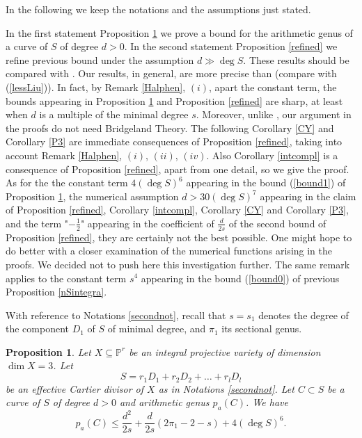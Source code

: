\documentclass[9pt,a4paper]{amsart}
\theoremstyle{plain}
\newtheorem{proposition}[theorem]{Proposition}
\theoremstyle{definition}
\theoremstyle{remark}
\begin{document}
In the following we keep the notations and the assumptions just
stated.

\smallskip
In the first statement Proposition \ref{nSnonintegra} we prove a
bound for the arithmetic genus of  a curve of $S$ of degree $d>0$.
In the second statement Proposition \ref{refined} we refine previous
bound under the assumption $d\gg \deg S$. These results should be
compared with \cite[Proposition 4.3 and Corollary 4.4]{Liu}. Our
results, in general, are more precise than
\cite[loc. cit.]{Liu} (compare with (\ref{lessLiu})).  In fact, by Remark \ref{Halphen}, $(i)$,
apart the constant term, the bounds appearing in  Proposition
\ref{nSnonintegra} and Proposition \ref{refined} are sharp, at least
when $d$ is a multiple of the minimal degree $s$. Moreover, unlike
\cite{Liu}, our argument in the proofs do not need Bridgeland
Theory. The following  Corollary \ref{CY} and Corollary \ref{P3} are
immediate consequences of Proposition \ref{refined}, taking into
account Remark \ref{Halphen}, $(i)$, $(ii)$, $(iv)$. Also Corollary \ref{intcompl} is a
consequence  of Proposition \ref{refined}, apart from one detail, so
we give the proof. As for the the constant term $4(\deg S)^6$
appearing in the bound (\ref{bound1}) of Proposition
\ref{nSnonintegra},  the numerical assumption $d>30(\deg S)^7$
appearing in the claim of Proposition \ref{refined}, Corollary
\ref{intcompl}, Corollary \ref{CY} and Corollary \ref{P3}, and the
term "$-\frac{1}{2}$" appearing in the coefficient of $\frac{d}{2s}$
of the second bound of Proposition \ref{refined}, they are certainly
not the best possible. One might hope to do better with a closer
examination of the numerical functions arising in the proofs. We
decided not to push here this investigation further. The same remark
applies to the constant term $s^4$ appearing in the bound
(\ref{bound0}) of previous Proposition \ref{nSintegra}.

With reference to Notations \ref{secondnot}, recall that $s=s_1$ denotes the degree
of the component $D_1$ of $S$ of minimal degree, and $\pi_1$ its sectional genus.

\begin{proposition}\label{nSnonintegra} Let $X\subseteq \mathbb P^r$
be an integral projective variety of dimension $\dim X=3$. Let
$$
S=r_1D_1 + r_2D_2 +\dots + r_lD_l
$$
be an effective Cartier divisor of $X$ as in Notations
\ref{secondnot}. Let $C\subset S$ be a curve of $S$ of degree $d>0$
and arithmetic genus $p_a(C)$. We have
\begin{equation}\label{bound1}
p_a(C)\leq \frac{d^2}{2s}+\frac{d}{2s}(2\pi_1-2-s)+4(\deg S)^6.
\end{equation}
\end{proposition}
\end{document}
